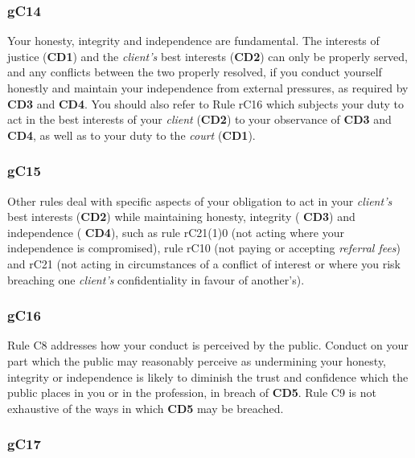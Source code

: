 \subsubsection{\color{darkgrey}gC14}

Your honesty, integrity and independence are fundamental. The interests
of justice (\textcolor{mygold}{\textbf{CD1}}) and the \emph{client's} best interests (\textcolor{mygold}{\textbf{CD2}}) can only
be properly served, and any conflicts between the two properly resolved,
if you conduct yourself honestly and maintain your independence from
external pressures, as required by  \textbf{\textcolor{mygold}{CD3}} and  \textbf{\textcolor{mygold}{CD4}}. You should also refer to
Rule rC16 which subjects your duty to act in the best interests of your
\emph{client} (\textcolor{mygold}{\textbf{CD2}}) to your observance of  \textbf{\textcolor{mygold}{CD3}} and  \textbf{\textcolor{mygold}{CD4}}, as well as to
your duty to the \emph{court} (\textcolor{mygold}{\textbf{CD1}}).

\subsubsection{\color{darkgrey}gC15}

Other rules deal with specific aspects of your obligation to act in your
\emph{client's} best interests (\textcolor{mygold}{\textbf{CD2}}) while maintaining honesty,
integrity ( \textbf{\textcolor{mygold}{CD3}}) and independence ( \textbf{\textcolor{mygold}{CD4}}), such as rule rC21(1)0 (not acting
where your independence is compromised), rule rC10 (not paying or
accepting \emph{referral fees}) and rC21 (not acting in circumstances of
a conflict of interest or where you risk breaching one \emph{client's}
confidentiality in favour of another's).

\subsubsection{\color{darkgrey}gC16}

Rule C8 addresses how your conduct is perceived by the public. Conduct
on your part which the public may reasonably perceive as undermining
your honesty, integrity or independence is likely to diminish the trust
and confidence which the public places in you or in the profession, in
breach of  \textbf{\textcolor{mygold}{CD5}}. Rule C9 is not exhaustive of the ways in which  \textbf{\textcolor{mygold}{CD5}} may be
breached.

\subsubsection{\color{darkgrey}gC17}

